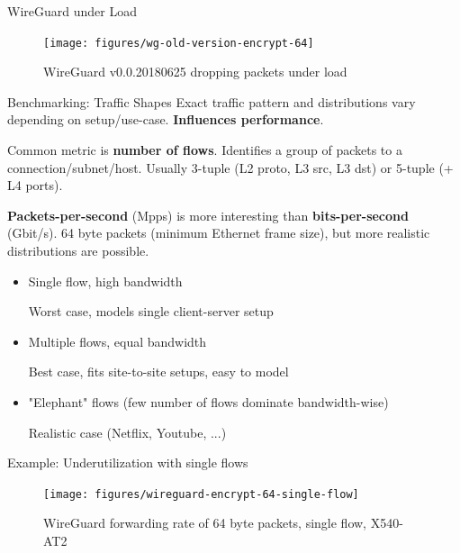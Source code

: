 \documentclass[NET,english]{tumbeamer}
\begin{document}
\begin{frame}{WireGuard under Load}
\begin{figure}
	\centering
	\texttt{[image: figures/wg-old-version-encrypt-64]}
	\caption{WireGuard v0.0.20180625 dropping packets under load}
	\label{fig:wg-old-version-encrypt-64}
\end{figure}

\end{frame}

\begin{frame}{Benchmarking: Traffic Shapes}
Exact traffic pattern and distributions vary depending on setup/use-case.
\textbf{Influences performance}.

Common metric is \textbf{number of flows}. Identifies a group of packets to a connection/subnet/host. Usually 3-tuple (L2 proto, L3 src, L3 dst) or 5-tuple (+ L4 ports).

\textbf{Packets-per-second} (Mpps) is more interesting than \textbf{bits-per-second} (Gbit/s). 64 byte packets (minimum Ethernet frame size), but more realistic distributions are possible.

\vspace*{-0.5em}
\begin{itemize}
	\item Single flow, high bandwidth
	
	Worst case, models single client-server setup
	
	\item Multiple flows, equal bandwidth
	
	Best case, fits site-to-site setups, easy to model
	
	\item "Elephant" flows (few number of flows dominate bandwidth-wise)
		
	Realistic case (Netflix, Youtube, ...)
\end{itemize}
\end{frame}

\begin{frame}{Example: Underutilization with single flows}
\begin{figure}
	\texttt{[image: figures/wireguard-encrypt-64-single-flow]}
	\caption{WireGuard forwarding rate of 64 byte packets, single flow, X540-AT2}
	\label{fig:wireguard-encrypt-64-single-flow}
\end{figure}


\end{frame}
\end{document}
